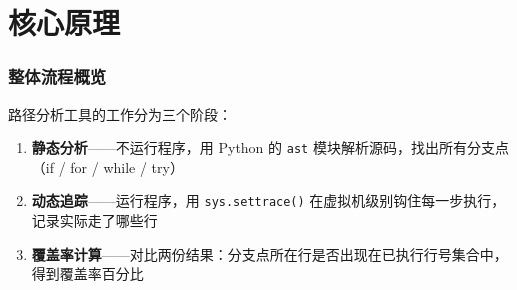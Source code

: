 \documentclass[presentation,aspectratio=169,fontset=none]{ctexbeamer}
\begin{document}

\section{核心原理}

\begin{frame}
\frametitle{整体流程概览}
路径分析工具的工作分为三个阶段：

\vspace{0.5cm}
\begin{enumerate}
    \item \textbf{静态分析}——不运行程序，用 Python 的 \texttt{ast} 模块解析源码，找出所有分支点（if / for / while / try）
    \vspace{0.3cm}
    \item \textbf{动态追踪}——运行程序，用 \texttt{sys.settrace()} 在虚拟机级别钩住每一步执行，记录实际走了哪些行
    \vspace{0.3cm}
    \item \textbf{覆盖率计算}——对比两份结果：分支点所在行是否出现在已执行行号集合中，得到覆盖率百分比
\end{enumerate}
\end{frame}

\end{document}
